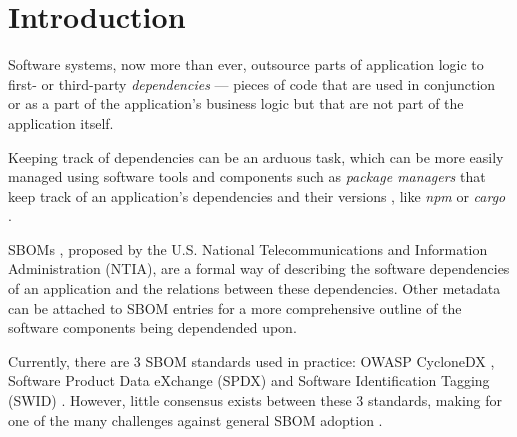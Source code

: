 \section{Introduction}

Software systems, now more than ever, outsource parts of application logic to first- or third-party \emph{dependencies} --- pieces of code that are used in conjunction or as a part of the application's business logic but that are not part of the application itself. \needsRef

Keeping track of dependencies can be an arduous task, which can be more easily managed using software tools and components such as \emph{package managers} that keep track of an application's dependencies and their versions \needsRef, like \emph{npm} or \emph{cargo} \cite{tools:pkg-mngr:npm,tools:pkg-mngr:cargo}.

SBOMs \cite{article:concept:sbom-2}, proposed by the U.S. National Telecommunications and Information Administration (NTIA), are a formal way of describing the software dependencies of an application and the relations between these dependencies. Other metadata can be attached to SBOM entries for a more comprehensive outline of the software components being dependended upon.

Currently, there are 3 SBOM standards used in practice: OWASP CycloneDX \cite{standards:sbom:cyclonedx}, Software Product Data eXchange (SPDX) \cite{standards:sbom:spdx} and Software Identification Tagging (SWID) \cite{standards:sbom:swid}. However, little consensus exists between these 3 standards, making for one of the many challenges against general SBOM adoption \cite{article:sbom-study}.

